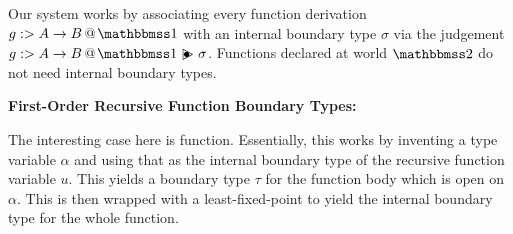 \documentclass[]{article}
\newcommand {\next}{asdlfkj}
\begin{document}
\begin{abstrsyn}
Our system works by associating every function derivation \mbox{$\colfun g {A \to B} \bbone$} with an internal boundary type $\sigma$
via the judgement $\ibtj g {A \to B} \sigma$.  
Functions declared at world $\bbtwo$ do not need internal boundary types.

\begin{framed}
\noindent\textbf{First-Order Recursive Function Boundary Types:}
\end{framed}

The interesting case here is function. 
Essentially, this works by inventing a type variable $\alpha$ and using that as the internal boundary type of the recursive function variable $u$.
This yields a boundary type $\tau$ for the function body which is open on $\alpha$.
This is then wrapped with a least-fixed-point to yield the internal boundary type for the whole function.






\end{abstrsyn}
\end{document}
